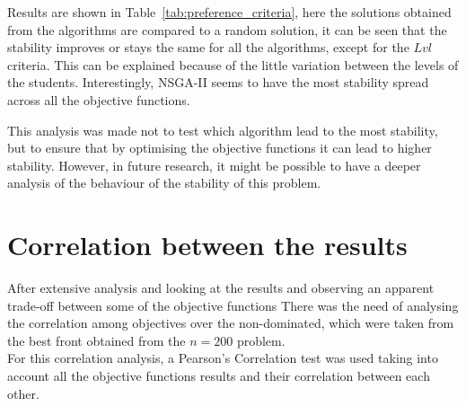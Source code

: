 Results are shown in Table~\ref{tab:preference_criteria}, here the solutions obtained from the algorithms are compared to a random solution, it can be seen that the stability improves or stays the same for all the algorithms, except for the $Lvl$ criteria. This can be explained because of the little variation between the levels of the students. Interestingly, NSGA-II seems to have the most stability spread across all the objective functions.\\

\begin{table}[H]
\centering
{}
\caption{Number of stable students in the groups by preference criteria}
\label{tab:preference_criteria}
\end{table}

This analysis was made not to test which algorithm lead to the most stability, but to ensure that by optimising the objective functions it can lead to higher stability. However, in future research, it might be possible to have a deeper analysis of the behaviour of the stability of this problem.
    
\section{Correlation between the results}

After extensive analysis and looking at the results and observing an apparent trade-off between some of the objective functions There was the need of analysing the correlation among objectives over the non-dominated, which were taken from the best front obtained from the $n=200$ problem.\\

For this correlation analysis, a Pearson's Correlation test was used taking into account all the objective functions results and their correlation between each other.

